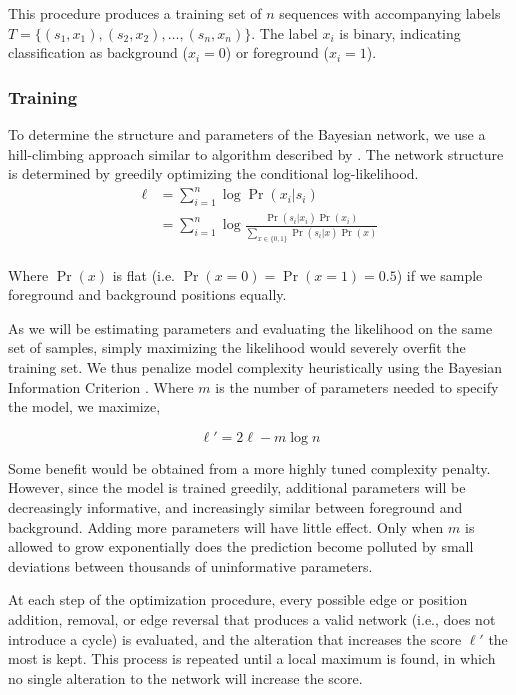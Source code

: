 \documentclass{bioinfo}
\begin{document}
This procedure produces a training set of $n$ sequences with accompanying labels
$T = \{ (s_1, x_1), (s_2, x_2), \dots, (s_n, x_n) \}$. The label $x_i$ is
binary, indicating classification as background ($x_i = 0$) or foreground ($x_i
= 1$).

\subsubsection{Training}


To determine the structure and parameters of the Bayesian network, we use a
hill-climbing approach similar to algorithm described by \citet{Grossman2004}.
The network structure is determined by greedily optimizing the conditional
log-likelihood.
\begin{align*}
\ell &= \sum_{i=1}^{n} \log \Pr( x_i | s_i ) \\
&=
\sum_{i=1}^{n} \log \frac{ \Pr(s_i | x_i) \Pr( x_i ) }{
\sum_{x \in \{0,1\}} \Pr( s_i | x ) \Pr(x) } \\
\end{align*}

Where $\Pr(x)$ is flat (i.e.  $\Pr( x = 0 ) = \Pr( x = 1 ) =
0.5$) if we sample foreground and background positions equally.

As we will be estimating parameters and evaluating the likelihood on the same
set of samples, simply maximizing the likelihood would severely overfit the
training set. We thus penalize model complexity heuristically using the Bayesian
Information Criterion \citep{Schwarz1978a}. Where $m$ is the number of
parameters needed to specify the model, we maximize, 

$$ \ell' = 2 \ell - m \log n $$

Some benefit would be obtained from a more highly tuned complexity penalty.
However, since the model is trained greedily, additional parameters will be
decreasingly informative, and increasingly similar between foreground and
background. Adding more parameters will have little effect.  Only when $m$ is
allowed to grow exponentially does the prediction become polluted by small
deviations between thousands of uninformative parameters.

At each step of the optimization procedure, every possible edge or position
addition, removal, or edge reversal that produces a valid network (i.e., does not
introduce a cycle) is evaluated, and the alteration that increases the score
$\ell'$ the most is kept.  This process is repeated until a local maximum is
found, in which no single alteration to the network will increase the score.
\end{document}
